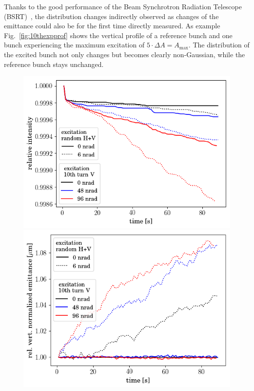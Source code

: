 \documentclass[%
 reprint,
 amsmath,amssymb,
 aps,
prstab,
]{revtex4-1}
\begin{document}
Thanks to the good performance of the Beam Synchrotron Radiation Telescope (BSRT)~\cite{bsrtprofinj}, the distribution changes indirectly observed as changes of the emittance could also be for the first time directly measured. As example Fig.~\ref{fig:10thexpprof} shows the vertical profile of a reference bunch and one bunch experiencing the maximum excitation of $5\cdot\Delta A=A_{\mathrm{max}}$. The distribution of the excited bunch not only changes but becomes clearly non-Gaussian, while the reference bunch stays unchanged.
\begin{figure}[h]
	\begin{minipage}[t]{0.49\linewidth}
		\centering
		\includegraphics[width=1.0\linewidth]{2016injerra2b2uran1_2e-3_10thV_3_5um_intensity.png}
	\end{minipage}
	\begin{minipage}[t]{0.49\linewidth}
		\centering
		\includegraphics[width=1.0\linewidth]{2016injerra2b2uran1_2e-3_10thV_3_5um_emit2_rel.png}

\end{minipage}
\end{figure}
\end{document}
